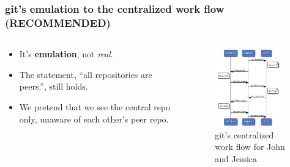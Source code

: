 \documentclass[11pt,ignorenonframetext,]{beamer}
\begin{document}
\begin{frame}\frametitle{git's emulation to the centralized work flow
(\textbf{RECOMMENDED})}

\begin{columns}
	\begin{column}{0.6\textwidth}
	\begin{itemize}
	\item It's \textbf{emulation}, not \emph{real}.
	\item The statement, ``all repositories are peers.'', still holds.
	\item We pretend that we see the central repo only, unaware of each other's peer repo.
	\end{itemize}
	\end{column}

	\begin{column}{0.4\textwidth}
	\begin{figure}[htbp]
	\centering
	\includegraphics[width=0.9\textwidth]{figures/gitcent.jpeg}
	\caption{git's centralized work flow for John and Jessica}
	\end{figure}
	\end{column}
\end{columns}

\end{frame}
\end{document}
